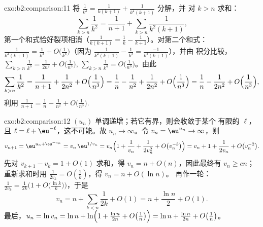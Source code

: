 \begin{solution}{exo:b2:comparison:11}
将 $\frac1{k^2} = \frac1{k(k+1)} + \frac1{k^2(k+1)}$ 分解，并
对 $k > n$ 求和：
\[
\sum_{k>n}\frac1{k^2} = \frac1{n+1} +
\sum_{k>n}\frac{1}{k^2(k+1)} ,
\]
第一个和式恰好裂项相消（$\frac1{k(k+1)} = \frac1k -
\frac1{k+1}$）。对第二个和式：$\frac{1}{k^2(k+1)} = \frac1{k^3}
+ O\bigl(\frac1{k^4}\bigr)$（因为 $\frac{1}{k^2(k+1)} -
\frac1{k^3} = \frac{-1}{k^3(k+1)}$），并由
积分比较，$\sum_{k>n}\frac1{k^3} = \frac1{2n^2} +
O\bigl(\frac1{n^3}\bigr)$, $\sum_{k>n}\frac1{k^4} =
O\bigl(\frac1{n^3}\bigr)$。由此
\[
\sum_{k>n}\frac1{k^2}
= \frac1{n+1} + \frac{1}{2n^2} + O\Bigl(\frac1{n^3}\Bigr)
= \frac1n - \frac1{n^2} + \frac{1}{2n^2} +
O\Bigl(\frac1{n^3}\Bigr)
= \frac1n - \frac{1}{2n^2} + O\Bigl(\frac1{n^3}\Bigr),
\]
利用 $\frac1{n+1} = \frac1n - \frac1{n^2} +
O\bigl(\frac1{n^3}\bigr)$.
\end{solution}

\begin{solution}{exo:b2:comparison:12}
$(u_n)$ 单调递增；若它有界，则会收敛于某个
有限的 $\ell$，且 $\ell = \ell + \eu^{-\ell}$，这不可能。故
$u_n \to \infty$。令 $v_n = \eu^{u_n} \to \infty$，则
\[
v_{n+1} = \eu^{u_n + \eu^{-u_n}} = v_n\,\eu^{1/v_n}
= v_n\Bigl(1 + \frac1{v_n} + \frac1{2v_n^2} +
O\bigl(v_n^{-3}\bigr)\Bigr)
= v_n + 1 + \frac{1}{2v_n} + O\bigl(v_n^{-2}\bigr).
\]
先对 $v_{k+1} - v_k = 1 + O(1)$ 求和，得 $v_n = n +
O(n)$，因此最终有 $v_n \geq cn$；重新求和时用
$\frac1{2v_k} = O(\frac1k)$，得 $v_n = n + O(\ln n)$。
再作一轮：$\frac{1}{2v_k} = \frac{1}{2k}\bigl(1 +
O\bigl(\tfrac{\ln k}k\bigr)\bigr)$，于是
\[
v_n = n + \sum_{k<n}\frac1{2k} + O(1) = n + \frac{\ln n}2 +
O(1).
\]
最后，$u_n = \ln v_n = \ln n + \ln\Bigl(1 + \frac{\ln n}{2n} +
O\bigl(\tfrac1n\bigr)\Bigr) = \ln n + \frac{\ln n}{2n} +
O\bigl(\tfrac1n\bigr)$。
\end{solution}

